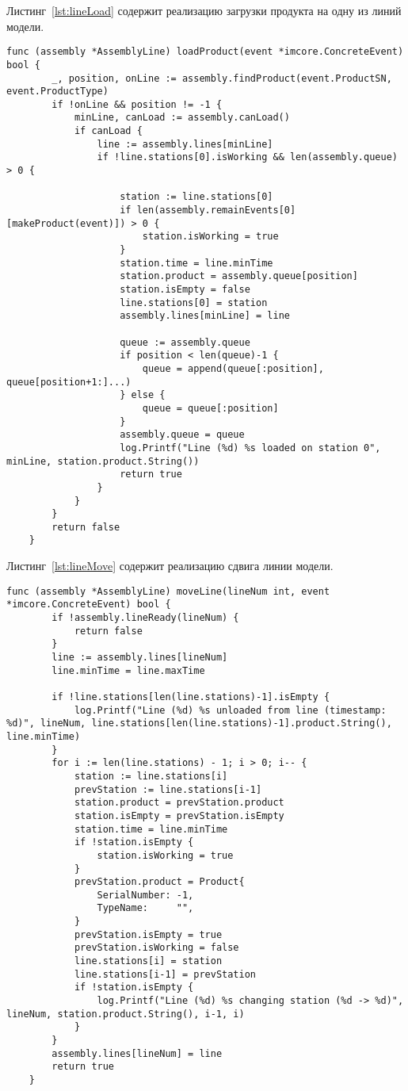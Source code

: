 Листинг~\ref{lst:lineLoad} содержит реализацию загрузки продукта на одну из линий модели.

\begin{lstlisting}[language=Golang,caption={Метод загрузки продукта на одну из линий},label=lst:lineLoad]
	func (assembly *AssemblyLine) loadProduct(event *imcore.ConcreteEvent) bool {
		_, position, onLine := assembly.findProduct(event.ProductSN, event.ProductType)
		if !onLine && position != -1 {
			minLine, canLoad := assembly.canLoad()
			if canLoad {
				line := assembly.lines[minLine]
				if !line.stations[0].isWorking && len(assembly.queue) > 0 {
					
					station := line.stations[0]
					if len(assembly.remainEvents[0][makeProduct(event)]) > 0 {
						station.isWorking = true
					}
					station.time = line.minTime
					station.product = assembly.queue[position]
					station.isEmpty = false
					line.stations[0] = station
					assembly.lines[minLine] = line
					
					queue := assembly.queue
					if position < len(queue)-1 {
						queue = append(queue[:position], queue[position+1:]...)
					} else {
						queue = queue[:position]
					}
					assembly.queue = queue
					log.Printf("Line (%d) %s loaded on station 0", minLine, station.product.String())
					return true
				}
			}
		}
		return false
	}
\end{lstlisting}

Листинг~\ref{lst:lineMove} содержит реализацию сдвига линии модели.

\begin{lstlisting}[language=Golang,caption={Метод сдвига линии},label=lst:lineMove]
	func (assembly *AssemblyLine) moveLine(lineNum int, event *imcore.ConcreteEvent) bool {
		if !assembly.lineReady(lineNum) {
			return false
		}
		line := assembly.lines[lineNum]
		line.minTime = line.maxTime
		
		if !line.stations[len(line.stations)-1].isEmpty {
			log.Printf("Line (%d) %s unloaded from line (timestamp: %d)", lineNum, line.stations[len(line.stations)-1].product.String(), line.minTime)
		}
		for i := len(line.stations) - 1; i > 0; i-- {
			station := line.stations[i]
			prevStation := line.stations[i-1]
			station.product = prevStation.product
			station.isEmpty = prevStation.isEmpty
			station.time = line.minTime
			if !station.isEmpty {
				station.isWorking = true
			}
			prevStation.product = Product{
				SerialNumber: -1,
				TypeName:     "",
			}
			prevStation.isEmpty = true
			prevStation.isWorking = false
			line.stations[i] = station
			line.stations[i-1] = prevStation
			if !station.isEmpty {
				log.Printf("Line (%d) %s changing station (%d -> %d)", lineNum, station.product.String(), i-1, i)
			}
		}
		assembly.lines[lineNum] = line
		return true
	}
\end{lstlisting}

